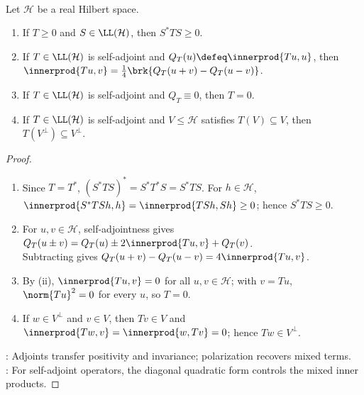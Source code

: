\begin{proposition} \label{prop:self-adjoint-positive-order-polarization} \\
Let $\mathcal{H}$ be a real Hilbert space.
\begin{enumerate}[label=(\roman*)]
\setlength{\itemsep}{0pt}
\item If $T\geq0$ and $S\in\LL(\mathcal{H})$, then $S^*TS\geq0$.
\item If $T\in\LL(\mathcal{H})$ is self-adjoint and $Q_T(u)\defeq\innerprod{Tu,u}$, then $\innerprod{Tu,v}=\frac{1}{4}\brk{Q_T(u+v)-Q_T(u-v)}$.
\item If $T\in\LL(\mathcal{H})$ is self-adjoint and $Q_T\equiv0$, then $T=0$.
\item If $T\in\LL(\mathcal{H})$ is self-adjoint and $V\leq\mathcal{H}$ satisfies $T(V)\subseteq V$, then $T(V^\perp)\subseteq V^\perp$.
\end{enumerate}
\begin{proof}
\begin{enumerate}[label=(\roman*)]
\setlength{\itemsep}{0pt}
\item Since $T=T^*$, $(S^*TS)^*=S^*T^*S=S^*TS$. For $h\in\mathcal H$, $\innerprod{S^*TSh,h}=\innerprod{TSh,Sh}\geq0$; hence $S^*TS\geq0$.
\item For $u,v\in\mathcal H$, self-adjointness gives $Q_T(u\pm v)=Q_T(u)\pm2\innerprod{Tu,v}+Q_T(v)$.\\
Subtracting gives $Q_T(u+v)-Q_T(u-v)=4\innerprod{Tu,v}$.
\item By (ii), $\innerprod{Tu,v}=0$ for all $u,v\in\mathcal H$; with $v=Tu$, $\norm{Tu}^2=0$ for every $u$, so $T=0$.
\item If $w\in V^\perp$ and $v\in V$, then $Tv\in V$ and $\innerprod{Tw,v}=\innerprod{w,Tv}=0$; hence $Tw\in V^\perp$.
\end{enumerate}
: Adjoints transfer positivity and invariance; polarization recovers mixed terms.\\
: For self-adjoint operators, the diagonal quadratic form controls the mixed inner products.
\end{proof}
\end{proposition}

